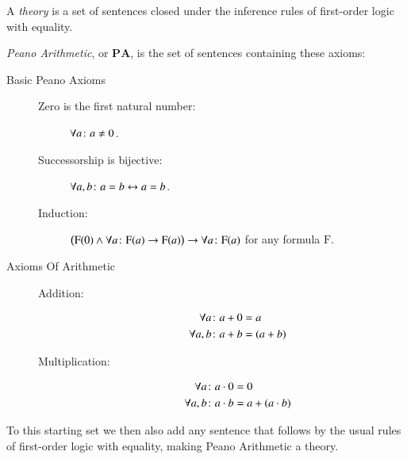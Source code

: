 \documentclass{article}
\theoremstyle{customstyle}
\newcommand{\PA}{\mathbf{PA}}
\let\S\relax
\newcommand{\S}{\text{S}}
\begin{document}
\begin{definition}[Theory]
A \emph{theory} is a set of sentences closed under the inference rules of first-order logic with equality.
\end{definition}

\begin{definition}
\emph{Peano Arithmetic}, or $\PA$, is the set of sentences containing these axioms:
\begin{description}
\item[Basic Peano Axioms]
\begin{description}
\item[]
\item[Zero is the first natural number:] $\forall a \colon \S a \neq 0$.
\item[Successorship is bijective:] $\forall a, b \colon \S a = \S b \leftrightarrow a = b$.
\item[Induction:] $\bigl(\mathrm{F}(0) \land \forall a \colon \mathrm{F}(a) \rightarrow \mathrm{F}(\S a)\bigr) \rightarrow \forall a \colon \mathrm{F}(a)$ for any formula $\mathrm{F}$.
\end{description}
\item[Axioms Of Arithmetic]
\begin{description}
\item[]
\item[Addition:]
\begin{align*}
\forall a \colon a + 0 & = a\\
\forall a, b \colon a + \S b & = \S(a + b)
\end{align*}
\item[Multiplication:]
\begin{align*}
\forall a \colon a \cdot 0 & = 0\\
\forall a, b \colon a \cdot \S b & = a + (a \cdot b)
\end{align*}
\end{description}
\end{description}
To this starting set we then also add any sentence that follows by the usual rules of first-order logic with equality, making Peano Arithmetic a theory.
\end{definition}
\end{document}
